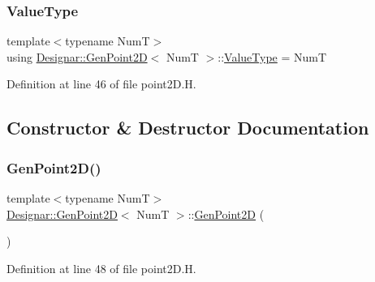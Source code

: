 \subsubsection{\texorpdfstring{Value\+Type}{ValueType}}
{\footnotesize\ttfamily template$<$typename NumT$>$ \\
using \hyperlink{class_designar_1_1_gen_point2_d}{Designar\+::\+Gen\+Point2D}$<$ NumT $>$\+::\hyperlink{class_designar_1_1_gen_point2_d_a8f13f44ca3438223d1ecdce2728b9437}{Value\+Type} =  NumT}



Definition at line 46 of file point2\+D.\+H.



\subsection{Constructor \& Destructor Documentation}
\mbox{\label{class_designar_1_1_gen_point2_d_aa55395ebde205564d3065dc6ce56c42b}} 
\subsubsection{\texorpdfstring{Gen\+Point2\+D()}{GenPoint2D()}\hspace{0.1cm}{\footnotesize\ttfamily [1/7]}}
{\footnotesize\ttfamily template$<$typename NumT$>$ \\
\hyperlink{class_designar_1_1_gen_point2_d}{Designar\+::\+Gen\+Point2D}$<$ NumT $>$\+::\hyperlink{class_designar_1_1_gen_point2_d}{Gen\+Point2D} (\begin{DoxyParamCaption}{ }\end{DoxyParamCaption})\hspace{0.3cm}{\ttfamily [inline]}}



Definition at line 48 of file point2\+D.\+H.

\mbox{\label{class_designar_1_1_gen_point2_d_adf5298d432b48187deef32941429a1b3}} 

